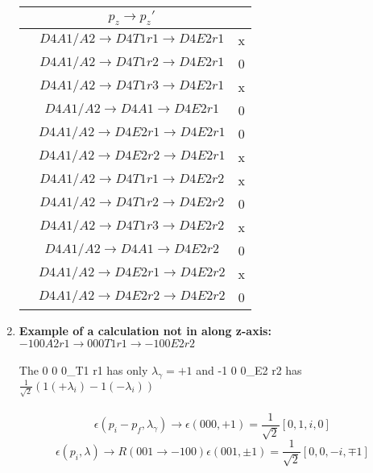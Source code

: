\documentclass[10pt]{article}
\begin{document}
\begin{enumerate}
\begin{table}[!htbp]
\begin{minipage}[!htbp]{0.33\textwidth}
\begin{tabular}{ccc}
\end{tabular}
\end{minipage}
\begin{minipage}[!htbp]{0.33\textwidth}
\raggedleft
\begin{tabular}{ccc}
&$p_z \rightarrow p_z' $&\\ \hline

&$ D4A1/A2 \rightarrow D4T1 r1 \rightarrow D4E2 r1 $& x\\
&$ D4A1/A2 \rightarrow D4T1 r2 \rightarrow D4E2 r1 $& 0\\
&$ D4A1/A2 \rightarrow D4T1 r3 \rightarrow D4E2 r1 $& x\\
&$ D4A1/A2 \rightarrow D4A1 \rightarrow D4E2 r1 $& 0\\
&$ D4A1/A2 \rightarrow D4E2 r1 \rightarrow D4E2 r1 $& 0\\
&$ D4A1/A2 \rightarrow D4E2 r2 \rightarrow D4E2 r1 $& x\\ \hline
&$ D4A1/A2 \rightarrow D4T1 r1 \rightarrow D4E2 r2 $& x\\
&$ D4A1/A2 \rightarrow D4T1 r2 \rightarrow D4E2 r2 $& 0\\
&$ D4A1/A2 \rightarrow D4T1 r3 \rightarrow D4E2 r2 $& x\\
&$ D4A1/A2 \rightarrow D4A1 \rightarrow D4E2 r2 $& 0\\
&$ D4A1/A2 \rightarrow D4E2 r1 \rightarrow D4E2 r2 $& x\\
&$ D4A1/A2 \rightarrow D4E2 r2 \rightarrow D4E2 r2 $& 0\\  \hline
\end{tabular}
\end{minipage}
\label{Tab}
\end{table}

\item \textbf{Example of a calculation not in along z-axis: }
$-1 0 0 A2 r1 \rightarrow 0 0 0 T1 r1 \rightarrow -1 0 0 E2 r2$\\\\
The 0 0 0_T1 r1 has only $\lambda_{\gamma}  = +1$ and -1 0 0_E2 r2 has $\frac{1}{\sqrt{2}}(1(+\lambda_i) - 1(-\lambda_i))$\\\\
\begin{equation}
\epsilon(p_i - p_f, \lambda_{\gamma}) \rightarrow  \epsilon(000, +1) = \frac{1}{\sqrt{2}}[0,1,i,0]
\end{equation}
\begin{equation}
\epsilon(p_i, \lambda) \rightarrow R(001 \rightarrow -100) \epsilon(001,\pm 1)  = \frac{1}{\sqrt{2}}[0,0,-i,\mp1]
\end{equation}


\end{enumerate}
\end{document}
